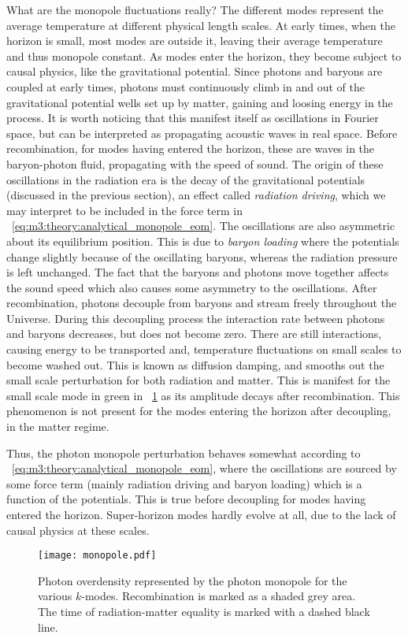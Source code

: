     What are the monopole fluctuations really? The different modes represent the average temperature at different physical length scales. At early times, when the horizon is small, most modes are outside it, leaving their average temperature and thus monopole constant. As modes enter the horizon, they become subject to causal physics, like the gravitational potential. Since photons and baryons are coupled at early times, photons must continuously climb in and out of the gravitational potential wells set up by matter, gaining and loosing energy in the process. It is worth noticing that this manifest itself as oscillations in Fourier space, but can be interpreted as propagating acoustic waves in real space. Before recombination, for modes having entered the horizon, these are waves in the baryon-photon fluid, propagating with the speed of sound. The origin of these oscillations in the radiation era is the decay of the gravitational potentials (discussed in the previous section), an effect called \textit{radiation driving}, which we may interpret to be included in the force term in ~\cref{eq:m3:theory:analytical_monopole_eom}. The oscillations are also asymmetric about its equilibrium position. This is due to \textit{baryon loading} where the potentials change slightly because of the oscillating baryons, whereas the radiation pressure is left unchanged. The fact that the baryons and photons move together affects the sound speed which also causes some asymmetry to the oscillations. After recombination, photons decouple from baryons and stream freely throughout the Universe. During this decoupling process the interaction rate between photons and baryons decreases, but does not become zero. There are still interactions, causing energy to be transported and, temperature fluctuations on small scales to become washed out. This is known as diffusion damping, and smooths out the small scale perturbation for both radiation and matter. This is manifest for the small scale mode in green in ~\cref{fig:m3:monopole} as its amplitude decays after recombination. This phenomenon is not present for the modes entering the horizon after decoupling, in the matter regime. 

    Thus, the photon monopole perturbation behaves somewhat according to ~\cref{eq:m3:theory:analytical_monopole_eom}, where the oscillations are sourced by some force term (mainly radiation driving and baryon loading) which is a function of the potentials. This is true before decoupling for modes having entered the horizon. Super-horizon modes hardly evolve at all, due to the lack of causal physics at these scales.
    \begin{figure}
        \texttt{[image: monopole.pdf]}
        \caption{Photon overdensity represented by the photon monopole for the various $k$-modes. Recombination is marked as a shaded grey area. The time of radiation-matter equality is marked with a dashed black line.}
        \label{fig:m3:monopole}
    \end{figure}

